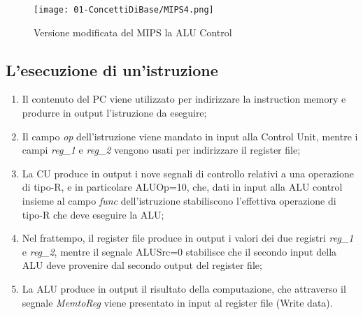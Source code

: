 


\begin{figure}[h]
    \centering
    \texttt{[image: 01-ConcettiDiBase/MIPS4.png]}
    \caption{Versione modificata del MIPS la ALU Control}
\end{figure}

\subsection{L'esecuzione di un'istruzione}

\begin{enumerate}
  \item Il contenuto del PC viene utilizzato per indirizzare la instruction memory e produrre in output l'istruzione da eseguire;
  \item Il campo \textit{op} dell’istruzione viene mandato in input alla Control
    Unit, mentre i campi \textit{reg\_1} e \textit{reg\_2} vengono usati per indirizzare il
register file;
\item La CU produce in output i nove segnali di controllo relativi a una
operazione di tipo-R, e in particolare ALUOp=10, che, dati in
input alla ALU control insieme al campo \textit{func} dell’istruzione
stabiliscono l’effettiva operazione di tipo-R che deve eseguire la
ALU;
\item Nel frattempo, il register file produce in output i valori dei due
  registri \textit{reg\_1} e \textit{reg\_2}, mentre il segnale ALUSrc=0 stabilisce che il
secondo input della ALU deve provenire dal secondo output del
register file;
\item La ALU produce in output il risultato della computazione, che
  attraverso il segnale \textit{MemtoReg} viene presentato in input al register
file (Write data).
\end{enumerate}

